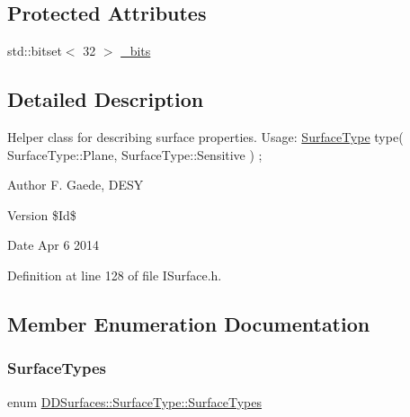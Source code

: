\subsection*{Protected Attributes}
\begin{DoxyCompactItemize}
\item 
std\+::bitset$<$ 32 $>$ \hyperlink{class_d_d_surfaces_1_1_surface_type_ac6414dd53b60dfcc487030c3ba1a3220}{\+\_\+bits}
\end{DoxyCompactItemize}


\subsection{Detailed Description}
Helper class for describing surface properties. Usage\+: \hyperlink{class_d_d_surfaces_1_1_surface_type}{Surface\+Type} type(  Surface\+Type\+::\+Plane, Surface\+Type\+::\+Sensitive ) ;

\begin{DoxyAuthor}{Author}
F. Gaede, D\+E\+SY 
\end{DoxyAuthor}
\begin{DoxyVersion}{Version}
\$\+Id\$ 
\end{DoxyVersion}
\begin{DoxyDate}{Date}
Apr 6 2014 
\end{DoxyDate}


Definition at line 128 of file I\+Surface.\+h.



\subsection{Member Enumeration Documentation}
\hypertarget{class_d_d_surfaces_1_1_surface_type_a2e946294c5368a34e227be2b17e73051}{}\label{class_d_d_surfaces_1_1_surface_type_a2e946294c5368a34e227be2b17e73051} 
\subsubsection{\texorpdfstring{Surface\+Types}{SurfaceTypes}}
{\footnotesize\ttfamily enum \hyperlink{class_d_d_surfaces_1_1_surface_type_a2e946294c5368a34e227be2b17e73051}{D\+D\+Surfaces\+::\+Surface\+Type\+::\+Surface\+Types}}



